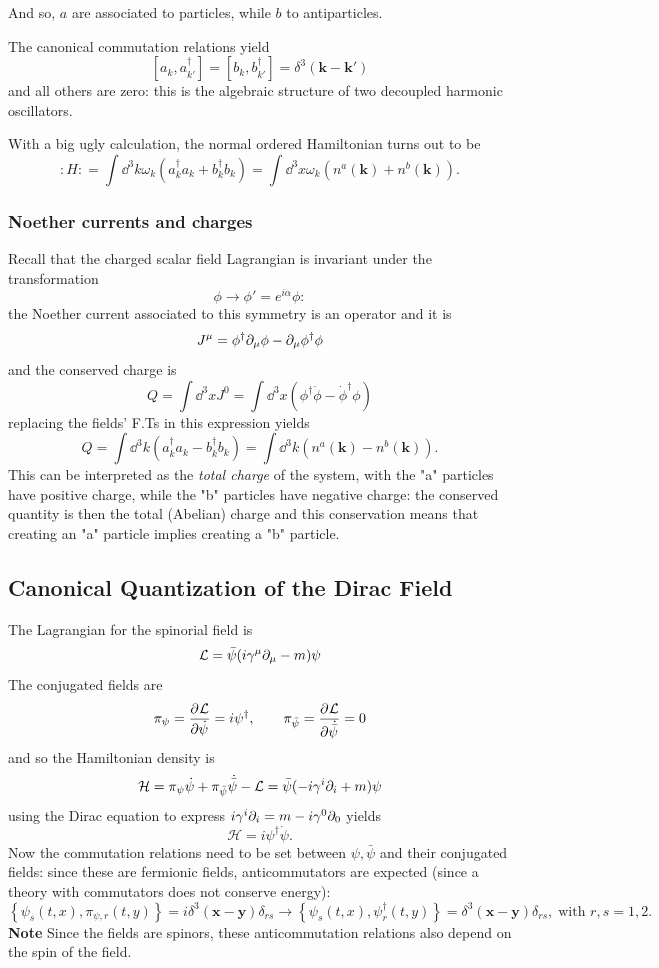 And so, $a$ are associated to particles, while $b$ to antiparticles.

The canonical commutation relations yield
$$\left[a_k,a^\dagger_{k'}\right] = \left[b_k,b^\dagger_{k'}\right]=\delta^3(
\mathbf{k-k'})$$
and all others are zero: this is the algebraic structure of two decoupled
harmonic oscillators.

With a big ugly calculation, the normal ordered Hamiltonian turns out to be
$$:H: = \int \dd ^3k\omega_k\left(a_k^\dagger a_k+b^\dagger_k b_k\right)=
\int \dd ^3x \omega_k\left(n^a(\mathbf{k})+n^b(\mathbf{k})\right).$$
\subsubsection{Noether currents and charges}
Recall that the charged scalar field Lagrangian is invariant under the
transformation
$$\phi\to\phi'=e^{i\alpha}\phi:$$
the Noether current associated to this symmetry is an operator and it is
$$J^\mu = \phi^\dagger\partial_\mu\phi - \partial_\mu\phi^\dagger \phi$$
and the conserved charge is
$$Q = \int \dd^3x J^0 = \int \dd^3x (\phi^\dagger\dot\phi-\dot\phi^\dagger\phi)$$
replacing the fields' F.Ts in this expression yields
$$Q=\int \dd^3k \left(a^\dagger_ka_k - b^\dagger_kb_k\right) = 
\int \dd^3k \left(n^a(\mathbf{k})-n^b(\mathbf{k})\right).$$
This can be interpreted as the \textit{total charge} of the system, with the "a"
particles have positive charge, while the "b" particles have negative charge:
the conserved quantity is then the total (Abelian) charge and this conservation
means that creating an "a" particle implies creating a "b" particle.
\subsection{Canonical Quantization of the Dirac Field}
The Lagrangian for the spinorial field is
$$\mathcal{L}=\bar\psi(i\gamma^\mu\partial_\mu-m)\psi$$
The conjugated fields are
\begin{gather*}
\pi_\psi = \pdv[]{\mathcal{L}}{\dot\psi}=i\psi^\dagger,\qquad
\pi_{\bar\psi} = \pdv[]{\mathcal{L}}{\dot{\bar\psi}}=0
\end{gather*}
and so the Hamiltonian density is
$$\mathcal{H} = \pi_\psi\dot\psi + \pi_{\bar\psi}\dot{\bar\psi} -\mathcal{L}=
\bar\psi(-i\gamma^i\partial_i+m)\psi$$
using the Dirac equation to express $i\gamma^i\partial_i = m-i\gamma^0\partial_0$ yields
$$\mathcal{H} = i\psi^\dagger\dot\psi.$$
Now the commutation relations need to be set between $\psi,\bar\psi$ and their
conjugated fields: since these are fermionic fields, anticommutators are expected
(since a theory with commutators does not conserve energy):
$$
\left\{\psi_s(t,x),\pi_{\psi,r}(t,y)\right\}=i\delta^3(\mathbf{x-y})\delta_{rs}\to
\left\{\psi_s(t,x),\psi_r^\dagger(t,y)\right\}=\delta^3(\mathbf{x-y})\delta_{rs},
\;\text{with }r,s=1,2.
$$
\textbf{Note} Since the fields are spinors, these anticommutation relations also
depend on the spin of the field.
